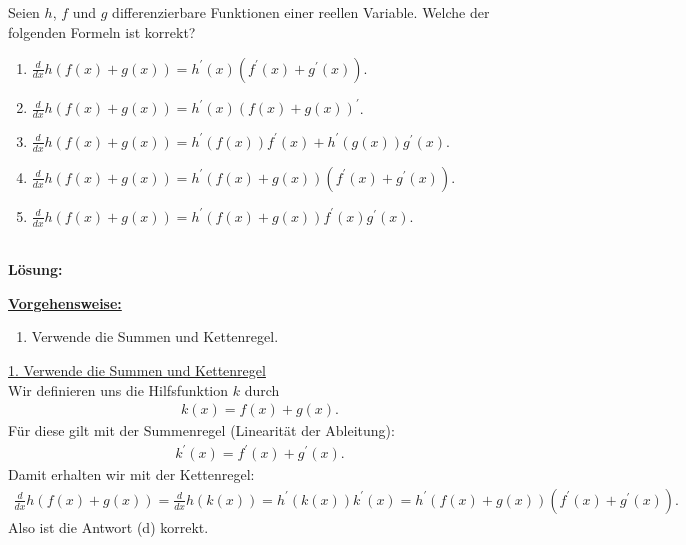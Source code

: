 \subsection*{}
Seien $h$, $f$ und $g$ differenzierbare Funktionen einer reellen Variable. Welche der folgenden Formeln ist korrekt?
\renewcommand{\labelenumi}{(\alph{enumi})}
\begin{enumerate}
	\item 
	$ \frac{d}{dx}h(f(x) + g(x)) = h^\prime(x) ( f^\prime(x) + g^\prime(x))$.
	\item 
	$ \frac{d}{dx}h(f(x) + g(x)) = h^\prime(x) ( f(x) + g(x))^\prime$.
	\item
	$ \frac{d}{dx}h(f(x) + g(x)) = h^\prime(f(x))  f^\prime(x) + h^\prime(g(x)) g^\prime(x)$.
	\item
	$ \frac{d}{dx}h(f(x) + g(x)) = h^\prime(f(x) + g(x))  (f^\prime(x) +  g^\prime(x) )$.
	\item
	$ \frac{d}{dx}h(f(x) + g(x)) = h^\prime(f(x) + g(x))  f^\prime(x)  g^\prime(x)$.
\end{enumerate}
\ \\
\textbf{Lösung:}
\begin{mdframed}
\underline{\textbf{Vorgehensweise:}}
\renewcommand{\labelenumi}{\theenumi.}
\begin{enumerate}
\item Verwende die Summen und Kettenregel.
\end{enumerate}
\end{mdframed}

\underline{1. Verwende die Summen und Kettenregel}\\
Wir definieren uns die Hilfsfunktion $k$ durch
\begin{align*}
	k(x) = f(x) + g(x).
\end{align*}
Für diese gilt mit der Summenregel (Linearität der Ableitung):
\begin{align*}
	k^\prime(x) = f^\prime(x) + g^\prime(x).
\end{align*}
Damit erhalten wir mit der Kettenregel:
\begin{align*}
	\frac{d}{dx}h(f(x) + g(x))
	=
	\frac{d}{dx}h(k(x))
	=
	h^\prime(k(x)) k^\prime(x)
	=
	h^\prime(f(x) + g(x)) (f^\prime(x) + g^\prime(x)).
\end{align*}
Also ist die Antwort (d) korrekt.


\newpage
